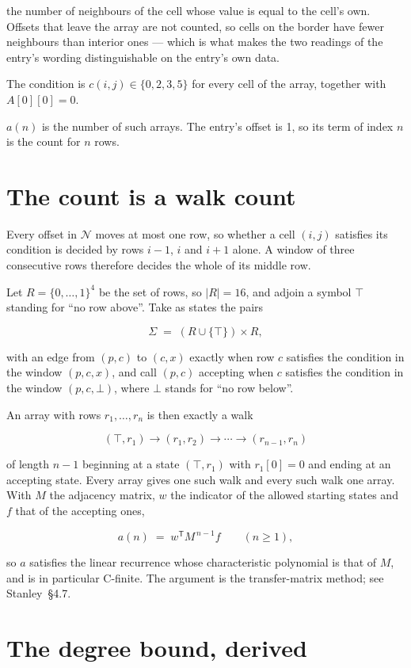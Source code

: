 \documentclass[11pt]{article}
\theoremstyle{definition}
\begin{document}
the number of neighbours of the cell whose value is equal to the cell's own. Offsets that leave the array are not counted, so cells on the border have fewer neighbours than interior ones --- which is what makes the two readings of the entry's wording distinguishable on the entry's own data.

The condition is $c(i,j) \in \{0, 2, 3, 5\}$ for every cell of the array, together with $A[0][0]=0$.

$a(n)$ is the number of such arrays. The entry's offset is 1, so its term of index $n$ is the count for $n$ rows.

\section{The count is a walk count}

Every offset in $\mathcal{N}$ moves at most one row, so whether a cell $(i,j)$ satisfies its condition is decided by rows $i-1$, $i$ and $i+1$ alone. A window of three consecutive rows therefore decides the whole of its middle row.

Let $R = \{0,\dots,1\}^{4}$ be the set of rows, so $|R| = 16$, and adjoin a symbol $\top$ standing for ``no row above''. Take as states the pairs

\[\Sigma \;=\; (R \cup \{\top\}) \times R,\]

with an edge from $(p,c)$ to $(c,x)$ exactly when row $c$ satisfies the condition in the window $(p,c,x)$, and call $(p,c)$ accepting when $c$ satisfies the condition in the window $(p,c,\bot)$, where $\bot$ stands for ``no row below''.

An array with rows $r_1,\dots,r_n$ is then exactly a walk

\[(\top,r_1) \to (r_1,r_2) \to \cdots \to (r_{n-1},r_n)\]

of length $n-1$ beginning at a state $(\top,r_1)$ with $r_1[0]=0$ and ending at an accepting state. Every array gives one such walk and every such walk one array. With $M$ the adjacency matrix, $w$ the indicator of the allowed starting states and $f$ that of the accepting ones,

\[a(n) \;=\; w^{\mathsf T} M^{\,n-1} f \qquad (n \ge 1),\]

so $a$ satisfies the linear recurrence whose characteristic polynomial is that of $M$, and is in particular C-finite. The argument is the transfer-matrix method; see Stanley~\S4.7.

\section{The degree bound, derived}
\end{document}
